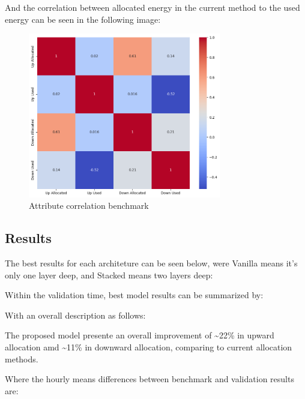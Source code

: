 And the correlation between allocated energy in the current method to the used energy can be seen in the following image:
\begin{figure}[H]
    \centering
    \includegraphics[width=0.75\textwidth]{plots/correlation_heatmap_benchmark.png}
    \caption{Attribute correlation benchmark}
    \label{fig:Attribute_correlation_benchmark}
  \end{figure}

  

\subsection{Results}

The best results for each architeture can be seen below, were Vanilla means it's only one layer deep, and Stacked means two layers deep:



Within the validation time, best model results can be summarized by:



With an overall description as follows:



The proposed model presente an overall improvement of \textasciitilde22\% in upward allocation amd \textasciitilde11\% in downward allocation, comparing to current allocation methods.\par

Where the hourly means differences between benchmark and validation results are:



